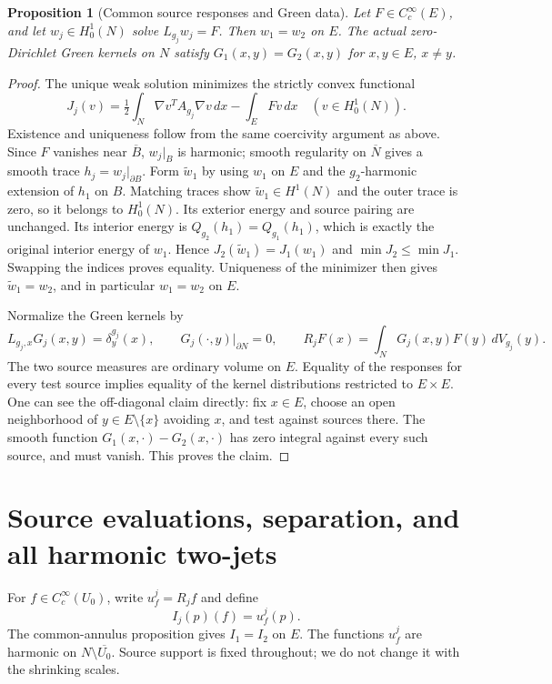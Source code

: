 \documentclass[11pt]{article}
\newtheorem{proposition}[theorem]{Proposition}
\theoremstyle{definition}
\theoremstyle{remark}
\numberwithin{equation}{section}
\begin{document}
\begin{proposition}[Common source responses and Green data]\label{data:cap}
Let $F\in C_c^\infty(E)$, and let $w_j\in H^1_0(N)$ solve
$L_{g_j}w_j=F$. Then $w_1=w_2$ on $E$. The actual zero-Dirichlet
Green kernels on $N$ satisfy $G_1(x,y)=G_2(x,y)$ for
$x,y\in E$, $x\ne y$.
\end{proposition}
\begin{proof}
The unique weak solution minimizes the strictly convex functional
\[
 J_j(v)=\tfrac12\int_N\nabla v^TA_{g_j}\nabla v\,dx
                              -\int_EFv\,dx
 \quad(v\in H^1_0(N)).
\]
Existence and uniqueness follow from the same coercivity argument as
above. Since $F$ vanishes near $\overline B$, $w_j|_B$ is harmonic;
smooth regularity on $\overline N$ gives a smooth trace
$h_j=w_j|_{\partial B}$. Form $\widetilde w_1$ by using $w_1$ on
$E$ and the $g_2$-harmonic extension of $h_1$ on $B$. Matching traces
show $\widetilde w_1\in H^1(N)$ and the outer trace is zero, so it
belongs to $H^1_0(N)$. Its exterior energy and source pairing are
unchanged. Its interior energy is $Q_{g_2}(h_1)=Q_{g_1}(h_1)$,
which is exactly the original interior energy of $w_1$. Hence
$J_2(\widetilde w_1)=J_1(w_1)$ and
$\min J_2\leq\min J_1$. Swapping the indices proves equality.
Uniqueness of the minimizer then gives $\widetilde w_1=w_2$,
and in particular $w_1=w_2$ on $E$.

Normalize the Green kernels by
\begin{equation}\label{data:green-normalization}
 L_{g_j,x}G_j(x,y)=\delta_y^{g_j}(x),\qquad
 G_j(\cdot,y)|_{\partial N}=0,
 \qquad R_jF(x)=\int_NG_j(x,y)F(y)\,dV_{g_j}(y).
\end{equation}
The two source measures are ordinary volume on $E$. Equality of the
responses for every test source implies equality of the kernel
distributions restricted to $E\times E$. One can see the off-diagonal
claim directly: fix $x\in E$, choose an open neighborhood of
$y\in E\setminus\{x\}$ avoiding $x$, and test against sources there.
The smooth function $G_1(x,\cdot)-G_2(x,\cdot)$ has zero integral
against every such source, and must vanish. This proves the claim.
\end{proof}

\section{Source evaluations, separation, and all harmonic two-jets}
\label{expanded:source-jets}
For $f\in C_c^\infty(U_0)$, write $u_f^j=R_jf$ and define
\begin{equation}\label{data:evaluations}
 I_j(p)(f)=u_f^j(p).
\end{equation}
The common-annulus proposition gives $I_1=I_2$ on $E$. The functions
$u_f^j$ are harmonic on $N\setminus\overline{U_0}$. Source support is
fixed throughout; we do not change it with the shrinking scales.
\end{document}
